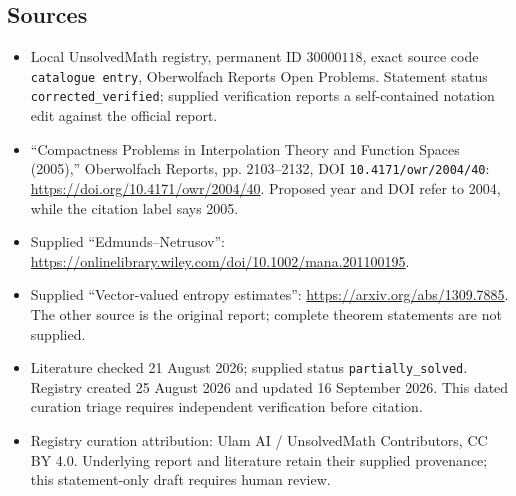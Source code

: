 \documentclass[11pt]{article}
\begin{document}
\subsection{Sources}
\begin{itemize}
\item Local UnsolvedMath registry, permanent ID \(30000118\), exact source code \texttt{catalogue entry}, Oberwolfach Reports Open Problems. Statement status \texttt{corrected\_verified}; supplied verification reports a self-contained notation edit against the official report.
\item ``Compactness Problems in Interpolation Theory and Function Spaces (2005),'' Oberwolfach Reports, pp. 2103--2132, DOI \texttt{10.4171/owr/2004/40}: \url{https://doi.org/10.4171/owr/2004/40}. Proposed year and DOI refer to 2004, while the citation label says 2005.
\item Supplied ``Edmunds--Netrusov'': \url{https://onlinelibrary.wiley.com/doi/10.1002/mana.201100195}.
\item Supplied ``Vector-valued entropy estimates'': \url{https://arxiv.org/abs/1309.7885}. The other source is the original report; complete theorem statements are not supplied.
\item Literature checked 21 August 2026; supplied status \texttt{partially\_solved}. Registry created 25 August 2026 and updated 16 September 2026. This dated curation triage requires independent verification before citation.
\item Registry curation attribution: Ulam AI / UnsolvedMath Contributors, CC BY 4.0. Underlying report and literature retain their supplied provenance; this statement-only draft requires human review.
\end{itemize}
\end{document}
